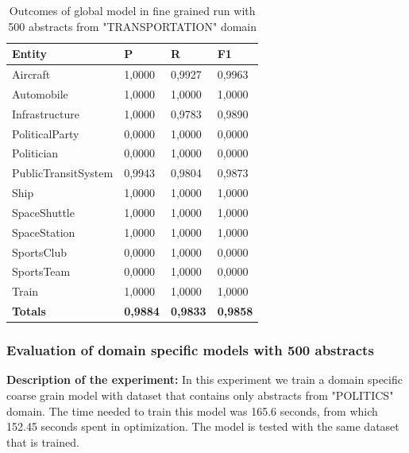 \documentclass[thesis=M,english]{FITthesis}[2018/05/30]
\begin{document}
	\begin{table}[H]\centering
		\begin{tabular}{|l|l|l|l|}
			\hline {\textbf{Entity}} & {\textbf{P}} & {\textbf{R}} & {\textbf{F1}}\\\hline
				Aircraft & 1,0000 & 0,9927 & 0,9963\\
				Automobile & 1,0000 & 1,0000 & 1,0000\\				
				Infrastructure & 1,0000 & 0,9783 & 0,9890\\
				PoliticalParty & 0,0000 & 1,0000 & 0,0000\\				
				Politician & 0,0000 & 1,0000 & 0,0000\\				
				PublicTransitSystem & 0,9943 & 0,9804 & 0,9873\\
				Ship & 1,0000 & 1,0000 & 1,0000\\				
				SpaceShuttle & 1,0000 & 1,0000 & 1,0000\\
				SpaceStation & 1,0000 & 1,0000 & 1,0000\\
				SportsClub & 0,0000 & 1,0000 & 0,0000\\
				SportsTeam & 0,0000 & 1,0000 & 0,0000\\
				Train & 1,0000 & 1,0000 & 1,0000\\\hline
				\textbf{Totals} & \textbf{0,9884} & \textbf{0,9833} & \textbf{0,9858}\\\hline
		\end{tabular}
		\caption{Outcomes of global model in fine grained run with 500 abstracts from "TRANSPORTATION" domain \label{table:500GlobalDomainWithTransportationTop500Fine}}
	\end{table}		
	

\subsubsection{Evaluation of domain specific models with 500 abstracts}

	\textbf{Description of the experiment:} In this experiment we train a domain specific coarse grain model with dataset that contains only abstracts from "POLITICS" domain. The time needed to train this model was 165.6 seconds, from which 152.45 seconds spent in optimization. The model is tested with the same dataset that is trained.
\end{document}
